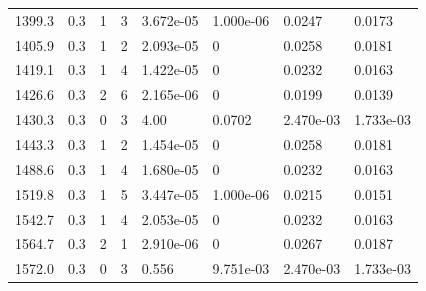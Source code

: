 \documentclass[preview]{standalone}
\begin{document}
{{{\begin{tabular}{L{1.2cm}C{1.2cm} C{0.3cm}C{0.5cm} C{1.4cm}C{1.4cm} C{1.4cm}C{1.4cm}}
  1399.3  &   0.3  & 1     &  3 &  3.672e-05  & 1.000e-06  & 0.0247 &  0.0173   \\ 
  1405.9  &   0.3  & 1     &  2 &  2.093e-05  & 0  & 0.0258 &  0.0181   \\ 
  1419.1  &   0.3  & 1     &  4 &  1.422e-05  & 0  & 0.0232 &  0.0163   \\ 
  1426.6  &   0.3  & 2     &  6 &  2.165e-06  & 0  & 0.0199 &  0.0139   \\ 
  1430.3  &   0.3  & 0     &  3 &  4.00  & 0.0702  & 2.470e-03 &  1.733e-03   \\ 
  1443.3  &   0.3  & 1     &  2 &  1.454e-05  & 0  & 0.0258 &  0.0181   \\ 
  1488.6  &   0.3  & 1     &  4 &  1.680e-05  & 0  & 0.0232 &  0.0163   \\ 
  1519.8  &   0.3  & 1     &  5 &  3.447e-05  & 1.000e-06  & 0.0215 &  0.0151   \\ 
  1542.7  &   0.3  & 1     &  4 &  2.053e-05  & 0  & 0.0232 &  0.0163   \\ 
  1564.7  &   0.3  & 2     &  1 &  2.910e-06  & 0  & 0.0267 &  0.0187   \\ 
  1572.0  &   0.3  & 0     &  3 &  0.556  & 9.751e-03  & 2.470e-03 &  1.733e-03   \\ 
\hline 
\end{tabular} 

}}}
\end{document}
